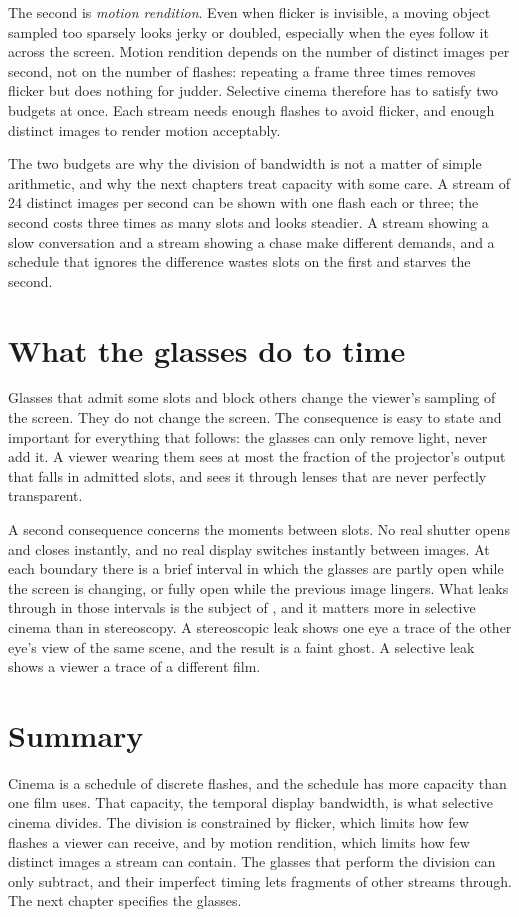 The second is \emph{motion rendition}. Even when flicker is invisible, a moving object sampled too sparsely looks jerky or doubled, especially when the eyes follow it across the screen. Motion rendition depends on the number of distinct images per second, not on the number of flashes: repeating a frame three times removes flicker but does nothing for judder. Selective cinema therefore has to satisfy two budgets at once. Each stream needs enough flashes to avoid flicker, and enough distinct images to render motion acceptably.

The two budgets are why the division of bandwidth is not a matter of simple arithmetic, and why the next chapters treat capacity with some care. A stream of 24 distinct images per second can be shown with one flash each or three; the second costs three times as many slots and looks steadier. A stream showing a slow conversation and a stream showing a chase make different demands, and a schedule that ignores the difference wastes slots on the first and starves the second.

\section{What the glasses do to time}

Glasses that admit some slots and block others change the viewer's sampling of the screen. They do not change the screen. The consequence is easy to state and important for everything that follows: the glasses can only remove light, never add it. A viewer wearing them sees at most the fraction of the projector's output that falls in admitted slots, and sees it through lenses that are never perfectly transparent.

A second consequence concerns the moments between slots. No real shutter opens and closes instantly, and no real display switches instantly between images. At each boundary there is a brief interval in which the glasses are partly open while the screen is changing, or fully open while the previous image lingers. What leaks through in those intervals is the subject of , and it matters more in selective cinema than in stereoscopy. A stereoscopic leak shows one eye a trace of the other eye's view of the same scene, and the result is a faint ghost. A selective leak shows a viewer a trace of a different film.

\section{Summary}

Cinema is a schedule of discrete flashes, and the schedule has more capacity than one film uses. That capacity, the temporal display bandwidth, is what selective cinema divides. The division is constrained by flicker, which limits how few flashes a viewer can receive, and by motion rendition, which limits how few distinct images a stream can contain. The glasses that perform the division can only subtract, and their imperfect timing lets fragments of other streams through. The next chapter specifies the glasses.
